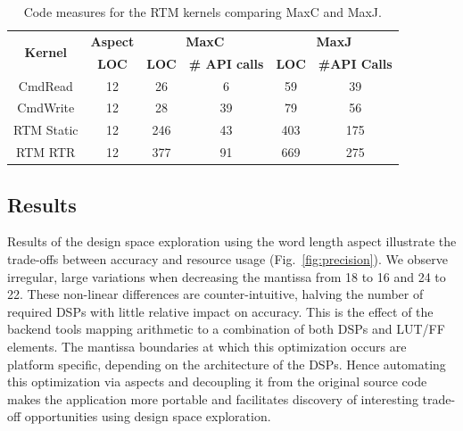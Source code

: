 \begin{table}[!h]
  \renewcommand{\arraystretch}{1.3}
  \centering
  \caption{Code measures for the RTM kernels comparing MaxC and
    MaxJ.}
  \label{table:loc}
  \begin{tabular}{c|ccc|cc}
    \hline
    \multirow{2}{*}{\bf{Kernel}} & \bf{Aspect } & \multicolumn{2}{c|}{\bf{MaxC}} & \multicolumn{2}{c}{\bf{MaxJ}}                   \\
    \                            & \bf{LOC}     & \bf{LOC}                       & \bf{\# API calls} & \bf{LOC} & \bf{\#API Calls} \\
    \hline \hline
    CmdRead                      & 12           & 26                             &      6         & 59       &      39        \\
    CmdWrite                     & 12           & 28                             &      39        & 79      &       56         \\
    RTM Static                   & 12           & 246                            &     43         & 403     &       175        \\
    RTM RTR                      & 12           & 377                            &     91         & 669     &       275       \\
  \end{tabular}
\end{table}


\subsection{Results}

Results of the design space exploration using the word length aspect
illustrate the trade-offs between accuracy and resource usage (Fig.~\ref{fig:precision}). We observe irregular, large variations when
decreasing the mantissa from 18 to 16 and 24 to 22. These non-linear
differences are counter-intuitive, halving the number of required DSPs
with little relative impact on accuracy. This is the effect of the
backend tools mapping arithmetic to a combination of both DSPs and
LUT/FF elements. The mantissa boundaries at which this optimization
occurs are platform specific, depending on the architecture of the
DSPs. Hence automating this optimization via aspects and decoupling it
from the original source code makes the application more portable and
facilitates discovery of interesting trade-off opportunities using
design space exploration.

